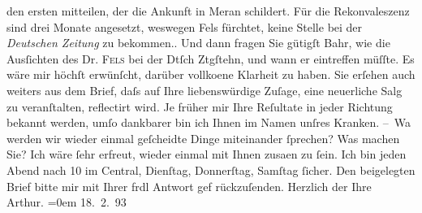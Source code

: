 \begin{ledgroupsized}[t]{13cm}
{{{                        den ersten mitteilen, der die Ankunft in Meran schildert. Für die Rekonvaleszenz sind drei Monate
                        angesetzt, weswegen Fels fürchtet, keine
                        Stelle bei der \emph{Deutschen Zeitung} zu
                        bekommen.}}}\label{K_L00178_1h}. Und dann fragen Sie gütigſt Bahr, wie die Ausſichten des Dr. \textsc{Fels} bei der Dtſch Ztgſtehn, und wann er eintreffen müſſte. Es wäre
                    mir höchſt erwünſcht, darüber vollko{\geminationm}ene Klarheit
                    zu haben. Sie erſehen auch {\pb}weiters aus dem Brief,
                    daſs auf Ihre liebenswürdige Zuſage, eine neuerliche Sa{\geminationm}lg zu veranſtalten, reflectirt wird. Je früher
                    mir Ihre Reſultate in jeder Richtung bekannt werden, umſo dankbarer bin ich
                    Ihnen im Namen unſres Kranken.\pend
           \pstart
           – Wa{\geminationn} werden wir wieder einmal geſcheidte Dinge {\pb}miteinander ſprechen? Was machen Sie? Ich wäre ſehr
                    erfreut, wieder einmal mit Ihnen zusa{\geminationm}en zu ſein.
                    Ich bin jeden Abend nach 10 im Central,
                    Dienſtag, Donnerſtag, Samſtag ſicher. Den beigelegten Brief bitte mir mit Ihrer
                    frdl Antwort gef rückzuſenden.\pend
           \pstart
           {\pb}Herzlich der Ihre{\\[\baselineskip]}\spacefill\mbox{Arthur.}\pend
           \leftskip=0em{}\pstart
           \raggedleft{}18. 2. 93\pend
           
         
         \endnumbering{}\end{ledgroupsized}  \newcommand{\dateiname}{L00178}\newcommand{\titel}{Arthur Schnitzler an Hugo von Hofmannsthal, 18. 2. 1893}\newcommand{\editorInnen}{ Martin Anton Müller und Gerd-Hermann Susen}
      